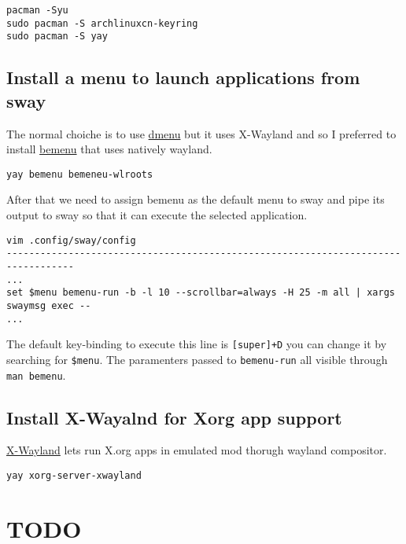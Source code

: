 \documentclass[12pt,A4]{article}
\begin{document}
\begin{verbatim}
pacman -Syu
sudo pacman -S archlinuxcn-keyring
sudo pacman -S yay
\end{verbatim}

\subsection{Install a menu to launch applications from sway}
The normal choiche is to use \href{https://wiki.archlinux.org/index.php/Dmenu}{dmenu} but it uses X-Wayland and so I preferred to install \href{https://github.com/Cloudef/bemenu}{bemenu} that uses natively wayland.

\begin{verbatim}
yay bemenu bemeneu-wlroots
\end{verbatim}
After that we need to assign bemenu as the default menu to sway and pipe its output to sway so that it can execute the selected application. 
\begin{verbatim}
vim .config/sway/config
----------------------------------------------------------------------------------
...
set $menu bemenu-run -b -l 10 --scrollbar=always -H 25 -m all | xargs 
swaymsg exec --
...
\end{verbatim}
The default key-binding to execute this line is \texttt{[super]+D} you can change it by searching for \texttt{\$menu}.
The paramenters passed to \texttt{bemenu-run} all visible through \texttt{man bemenu}.

\subsection{Install X-Wayalnd for Xorg app support}
\href{https://wayland.freedesktop.org/xserver.html}{X-Wayland} lets run X.org apps in emulated mod thorugh wayland compositor.

\begin{verbatim}
yay xorg-server-xwayland
\end{verbatim}

\section{TODO}
\end{document}
